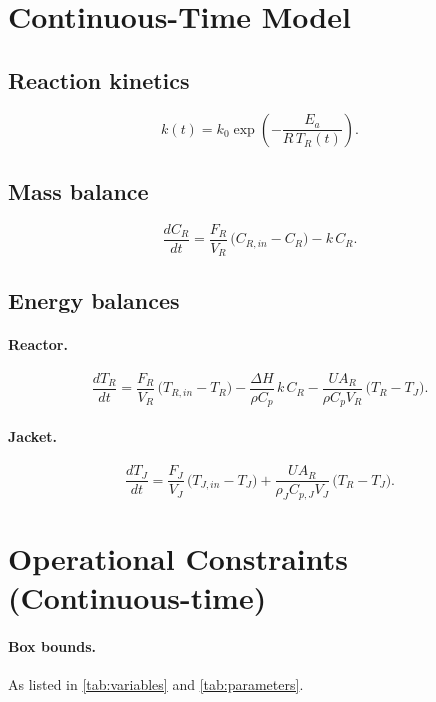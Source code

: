 \documentclass[11pt]{article}
\begin{document}
\section{Continuous-Time Model}
\subsection{Reaction kinetics}
\begin{equation}
    k(t) = k_0 \exp\!\left(-\frac{E_a}{R\,T_R(t)}\right).
\end{equation}

\subsection{Mass balance}
\begin{equation}
    \frac{d C_R}{dt} = \frac{F_R}{V_R}\,\big(C_{R,in} - C_R\big) - k\,C_R.
\end{equation}

\subsection{Energy balances}
\paragraph{Reactor.}
\begin{equation}
    \frac{d T_R}{dt}
    = \frac{F_R}{V_R}\,\big(T_{R,in} - T_R\big)
      - \frac{\Delta H}{\rho C_p}\,k\,C_R
      - \frac{U A_R}{\rho C_p V_R}\,\big(T_R - T_J\big).
\end{equation}

\paragraph{Jacket.}
\begin{equation}
    \frac{d T_J}{dt}
    = \frac{F_J}{V_J}\,\big(T_{J,in} - T_J\big)
      + \frac{U A_R}{\rho_J C_{p,J} V_J}\,\big(T_R - T_J\big).
\end{equation}

\section{Operational Constraints (Continuous-time)}
\paragraph{Box bounds.} As listed in \cref{tab:variables} and \cref{tab:parameters}.
\end{document}
